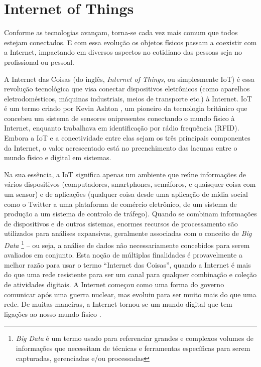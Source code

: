 \section{Internet of Things}
\label{sec:iot}

Conforme as tecnologias avançam, torna-se cada vez mais comum que todos estejam conectados. E com essa evolução os objetos físicos passam a coexistir com a Internet, impactando em diversos aspectos no cotidiano das pessoas seja no profissional ou pessoal.

A Internet das Coisas (do inglês, \textit{Internet of Things}, ou simplesmente IoT) é essa revolução tecnológica que visa conectar dispositivos eletrônicos (como aparelhos eletrodomésticos, máquinas industriais, meios de transporte etc.) à Internet. IoT é um termo criado por Kevin Ashton \cite{Kevin}, um pioneiro da tecnologia britânico que concebeu um sistema de sensores onipresentes conectando o mundo físico à Internet, enquanto trabalhava em identificação por rádio frequência (RFID). Embora a IoT e a conectividade entre elas sejam os três principais componentes da Internet, o valor acrescentado está no preenchimento das lacunas entre o mundo físico e digital em sistemas.

Na sua essência, a IoT significa apenas um ambiente que reúne informações de vários dispositivos (computadores, smartphones, semáforos, e quaisquer coisa com um sensor) e de aplicações (qualquer coisa desde uma aplicação de mídia social como o Twitter a uma plataforma de comércio eletrônico, de um sistema de produção a um sistema de controlo de tráfego). Quando se combinam informações de dispositivos e de outros sistemas, enormes recursos de processamento são utilizados para análises expansivas, geralmente associadas com o conceito de \textit{Big Data} \footnote{\textit{Big Data} é um termo usado para referenciar grandes e complexos volumes de informações que necessitam de técnicas e ferramentas específicas para serem capturadas, gerenciadas e/ou processadas} – ou seja, a análise de dados não necessariamente concebidos para serem avaliados em conjunto. Esta noção de múltiplas finalidades é provavelmente a melhor razão para usar o termo “Internet das Coisas”, quando a Internet é mais do que uma rede resistente para ser um canal para qualquer combinação e coleção de atividades digitais. A Internet começou como uma forma do governo comunicar após uma guerra nuclear, mas evoluiu para ser muito mais do que uma rede. De muitas maneiras, a Internet tornou-se um mundo digital que tem ligações ao nosso mundo físico \cite{ComputerWorld}.

